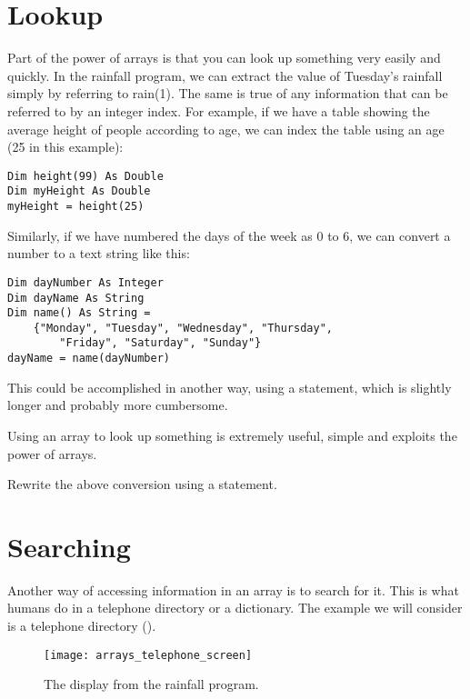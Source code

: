 	\section{Lookup}
		Part of the power of arrays is that you can look up something very easily and quickly. In the rainfall program, we can extract the value of Tuesday's rainfall simply by referring to rain(1). The same is true of any information that can be referred to by an integer index. For example, if we have a table showing the average height of people according to age, we can index the table using an age (25 in this example):
		\begin{lstlisting}
Dim height(99) As Double
Dim myHeight As Double
myHeight = height(25)
		\end{lstlisting}
Similarly, if we have numbered the days of the week as 0 to 6, we can convert a number to a text string like this:
		\begin{lstlisting}
Dim dayNumber As Integer
Dim dayName As String
Dim name() As String =
	{"Monday", "Tuesday", "Wednesday", "Thursday",
		"Friday", "Saturday", "Sunday"}
dayName = name(dayNumber)
		\end{lstlisting}
		This could be accomplished in another way, using a  statement, which is slightly longer and probably more cumbersome.
		
		Using an array to look up something is extremely useful, simple and exploits the power of arrays.

		\begin{stqb}
			\begin{STQ}
				\item Rewrite the above conversion using a  statement.
			\end{STQ}
		\end{stqb}


	\section{Searching}
	Another way of accessing information in an array is to search for it. This is what humans do in a telephone directory or a dictionary. The example we will consider is a telephone directory ().
		\begin{figure}[bth]
			\centering
			\texttt{[image: arrays\_telephone\_screen]}
			\caption{The display from the rainfall program.}
			\label{fig:arrays_telephone_screen}
		\end{figure}

